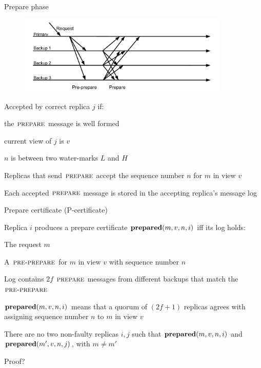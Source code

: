 \begin{frame}{Prepare phase}

\begin{figure}
\includegraphics[width=0.9\textwidth, trim=0 20 0 60]{figs/16/messages2}
\end{figure}
\begin{overprint}
\BI
\item Accepted by correct replica $j$ if:
\BI
\item the $\textsc{prepare}$ message is well formed
\item current view of $j$ is $v$
\item $n$ is between two water-marks $L$ and $H$
\EI
\EI

\BI
\item Replicas that send $\textsc{prepare}$ accept the sequence number $n$ for $m$ in view $v$
\item Each accepted $\textsc{prepare}$ message is stored in the accepting replica's message log
\EI

\end{overprint}
\end{frame}

\begin{frame}{Prepare certificate (P-certificate)}

\BIL
\item Replica $i$ produces a \alert{prepare certificate} $\mathbf{prepared}(m,v,n,i)$ iff its log holds:
	\BI
	\item The request $m$
	\item A $\textsc{pre-prepare}$ for $m$ in view $v$ with sequence number $n$
	\item Log contains $2f$ $\textsc{prepare}$ messages from different backups that match the $\textsc{pre-prepare}$
	\EI
\item $\mathbf{prepared}(m,v,n,i)$ means that a quorum of \alert{$(2f+1)$} replicas agrees with assigning sequence number $n$ to $m$ in view $v$
\EIL

\smallskip
\begin{theorem}
There are no two non-faulty replicas $i, j$ such that $\mathbf{prepared}(m, v, n, i)$
and $\mathbf{prepared}(m',v , n, j)$, with $m \neq m'$
\end{theorem}

\smallskip
Proof?

\end{frame}

